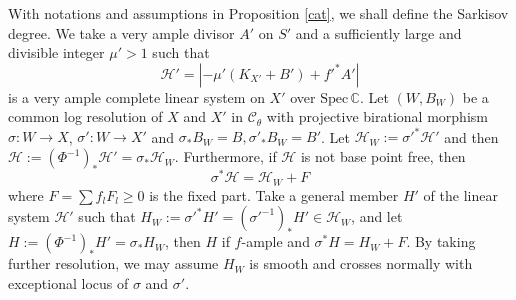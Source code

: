 \documentclass{article}
\begin{document}
With notations and assumptions in Proposition \ref{cat},   we shall define the Sarkisov degree. We take a  very ample divisor $ A'  $ on $ S' $ and a sufficiently large and divisible integer $ \mu'>1 $ such that 
\[ \mathcal{H}'=|-\mu' (K_{X'}+B') +f'^*A'| \]
is a very ample complete linear system on $ X' $ over $ \mathrm{Spec}\,\mathbb{C} $. Let $ (W,B_W) $ be a common log resolution of $ X $ and $ X' $ in $ \mathcal{C}_\theta $ with projective birational morphism $ \sigma:W\to X$,   $\sigma':W\to X' $ and $\sigma_*B_W=B, \sigma'_*B_W=B' $. Let $\mathcal{H}_W:=\sigma'^*\mathcal{H}'$
and then $\mathcal{H}:=(\Phi^{-1})_*\mathcal{H}'=\sigma_*\mathcal{H}_W$. Furthermore, if $ \mathcal{H} $ is not base point free, then
\[ \sigma^*\mathcal{H}=\mathcal{H}_W+F \]
where $ F=\sum f_lF_l\geqslant0 $ is the fixed part. Take a general member $ H' $ of the linear system $ \mathcal{H}' $ such that $ H_W:=\sigma'^*H'=(\sigma'^{-1})_*H'\in \mathcal{H}_W $, and let $ H:=(\Phi^{-1})_*H'=\sigma_*H_{W} $, then $H$ if $f$-ample and $ \sigma^*H=H_W+F $. By taking further resolution, we may assume $H_{W}$ is smooth and crosses normally with exceptional locus of $\sigma$ and $\sigma'$.

\end{document}
